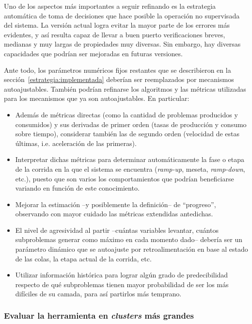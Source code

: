 Uno de los aspectos más importantes a seguir refinando es la estrategia automática de toma de decisiones que hace posible la operación no supervisada del sistema. La versión actual logra evitar la mayor parte de los errores más evidentes, y así resulta capaz de llevar a buen puerto verificaciones breves, medianas y muy largas de propiedades muy diversas. Sin embargo, hay diversas capacidades que podrían ser mejoradas en futuras versiones.

Ante todo, los parámetros numéricos fijos restantes que se describieron en la sección~\ref{estrategia:implementada} deberían ser reemplazados por mecanismos autoajustables. También podrían refinarse los algoritmos y las métricas utilizadas para los mecanismos que ya son autoajustables. En particular:

\begin{itemize}
	\item Además de métricas directas (como la cantidad de problemas producidos y consumidos) y sus derivadas de primer orden (tasas de producción y consumo sobre tiempo), considerar también las de segundo orden (velocidad de estas últimas, i.e. aceleración de las primeras).
	\item Interpretar dichas métricas para determinar automáticamente la fase o etapa de la corrida en la que el sistema se encuentra (\emph{ramp-up}, meseta, \emph{ramp-down}, etc.), puesto que son varios los comportamientos que podrían beneficiarse variando en función de este conocimiento.
	\item Mejorar la estimación --y posiblemente la definición-- de ``progreso'', observando con mayor cuidado las métricas extendidas antedichas.
	\item El nivel de agresividad al partir --cuántas variables levantar, cuántos subproblemas generar como máximo en cada momento dado-- debería ser un parámetro dinámico que se autoajuste por retroalimentación en base al estado de las colas, la etapa actual de la corrida, etc.
	\item Utilizar información histórica para lograr algún grado de predecibilidad respecto de qué subproblemas tienen mayor probabilidad de ser los más difíciles de su camada, para así partirlos más temprano.
	\end{itemize}


\subsubsection{Evaluar la herramienta en \emph{clusters} más grandes}

